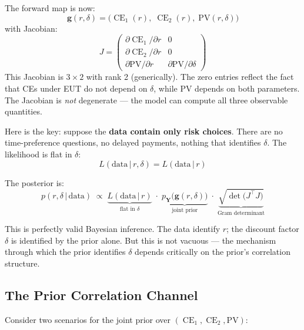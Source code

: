 \documentclass[11pt,a4paper]{article}
\theoremstyle{definition}
\newcommand{\given}{\,|\,}
\DeclareMathOperator{\CE}{CE}
\begin{document}
The forward map is now:
\begin{equation}
    \mathbf{g}(r, \delta) = \big(\CE_1(r),\; \CE_2(r),\;
    \mathrm{PV}(r, \delta)\big)
\end{equation}
with Jacobian:
\begin{equation}
    J = \begin{pmatrix}
    \partial \CE_1 / \partial r & 0 \\
    \partial \CE_2 / \partial r & 0 \\
    \partial \mathrm{PV} / \partial r & \partial \mathrm{PV} / \partial \delta
    \end{pmatrix}
\end{equation}
This Jacobian is $3 \times 2$ with rank 2 (generically). The zero entries
reflect the fact that CEs under EUT do not depend on $\delta$, while PV
depends on both parameters. The Jacobian is \emph{not} degenerate --- the
model can compute all three observable quantities.

Here is the key: suppose the \textbf{data contain only risk choices}. There are
no time-preference questions, no delayed payments, nothing that identifies
$\delta$. The likelihood is flat in $\delta$:
\begin{equation}
    L(\text{data} \given r, \delta) = L(\text{data} \given r)
\end{equation}

The posterior is:
\begin{equation}
    \label{eq:cross_posterior}
    p(r, \delta \given \text{data})
    \;\propto\;
    \underbrace{L(\text{data} \given r)}_{\text{flat in } \delta}
    \;\cdot\;
    \underbrace{p_{\mathbf{Y}}\!\big(\mathbf{g}(r, \delta)\big)}_{\text{joint prior}}
    \;\cdot\;
    \underbrace{\sqrt{\det\!\big(J^\top J\big)}}_{\text{Gram determinant}}
\end{equation}

This is perfectly valid Bayesian inference. The data identify $r$; the
discount factor $\delta$ is identified by the prior alone. But this is not
vacuous --- the mechanism through which the prior identifies $\delta$ depends
critically on the prior's correlation structure.

\subsection{The Prior Correlation Channel}

Consider two scenarios for the joint prior over
$(\CE_1, \CE_2, \mathrm{PV})$:
\end{document}
